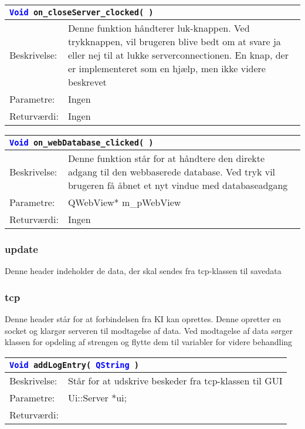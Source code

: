 \begin{table}[H]
\begin{tabular}{l p{12.5cm}}
\multicolumn{2}{l}{\texttt{\textcolor{blue}{Void} on\_closeServer\_clocked( )}} \\
\hline
Beskrivelse: &Denne funktion håndterer luk-knappen. Ved trykknappen, vil brugeren blive bedt om at svare ja eller nej til at lukke serverconnectionen. En knap, der er implementeret som en hjælp, men ikke videre beskrevet \\
Parametre: & Ingen\\
Returværdi: & Ingen\\
\end{tabular}
\end{table}

\begin{table}[H]
\begin{tabular}{l p{12.5cm}}
\multicolumn{2}{l}{\texttt{\textcolor{blue}{Void} on\_webDatabase\_clicked( )}} \\
\hline
Beskrivelse: & Denne funktion står for at håndtere den direkte adgang til den webbaserede database. Ved tryk vil brugeren få åbnet et nyt vindue med databaseadgang \\
Parametre: & QWebView* m\_pWebView\\
Returværdi: & Ingen\\
\end{tabular}
\end{table}

\subsubsection{update}
Denne header indeholder de data, der skal sendes fra tcp-klassen til savedata

\subsubsection{tcp}
Denne header står for at forbindelsen fra KI kan oprettes. Denne opretter en socket og klargør serveren til modtagelse af data. Ved modtagelse af data sørger klassen for opdeling af strengen og flytte dem til variabler for videre behandling

\begin{table}[H]
\begin{tabular}{l p{12.5cm}}
\multicolumn{2}{l}{\texttt{\textcolor{blue}{Void} addLogEntry( \textcolor{blue}{QString} )}} \\
\hline
Beskrivelse: & Står for at udskrive beskeder fra tcp-klassen til GUI \\
Parametre: & Ui::Server *ui;\\
Returværdi:&\\
\end{tabular}
\end{table}

